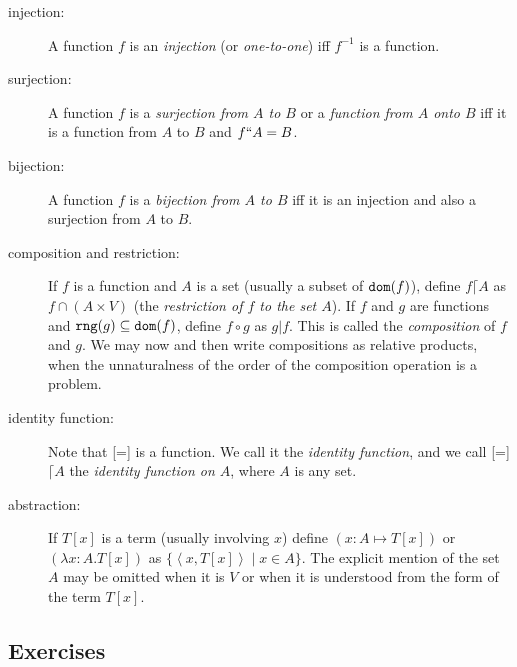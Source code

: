 \documentclass[12pt]{book}
\begin{document}
\begin{description}
\item[injection:] A function $f$ is an {\em injection\/} (or {\em one-to-one\/}) iff $f^{-1}$ is a
function.

\item[surjection:] A function $f$ is a {\em surjection from $A$ to
$B$\/} or a {\em function from $A$ onto $B$\/} iff it is a function
from $A$ to $B$ and $f``A=B$.

\item[bijection:] A function $f$ is a {\em bijection from $A$ to $B$\/} iff it
is an injection and also a surjection from $A$ to $B$.

\item[composition and restriction:] If $f$ is a function and $A$ is a
set (usually a subset of ${\tt dom}(f)$), define $f\lceil A$ as $f
\cap (A \times V)$ (the {\em restriction of $f$ to the set $A$\/}).
If $f$ and $g$ are functions and ${\tt rng}(g) \subseteq {\tt
dom}(f)$, define $f \circ g$ as $g|f$.  This is called the {\em
composition\/} of $f$ and $g$.  We may now and then write compositions as relative products, when the unnaturalness of the order of the composition operation is a problem.

\item[identity function:] Note that [=] is a function.  We call it the
{\em identity function\/}, and we call [=]$\lceil A$ the {\em identity
function on $A$\/}, where $A$ is any set.

\item[abstraction:] If $T[x]$ is a term (usually involving $x$) define
$(x:A \mapsto T[x])$ or $(\lambda x:A.T[x])$ as
$\{\left<x,T[x]\right>\mid x \in A\}$.  The explicit mention of
the set $A$ may be omitted when it is $V$ or when it is understood
from the form of the term $T[x]$.

\end{description}

\subsection{Exercises}
\end{document}
